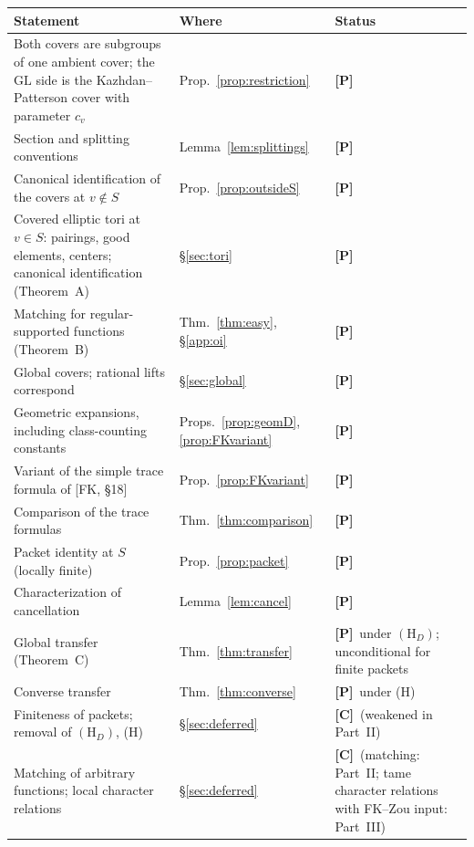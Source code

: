 \documentclass[12pt]{article}
\newcommand{\GL}{\mathrm{GL}}
\newcommand{\Pv}{\textbf{[P]}}
\newcommand{\Cv}{\textbf{[C]}}
\theoremstyle{plain}
\theoremstyle{definition}
\begin{document}
\begin{center}
\begin{tabular}{>{\raggedright\arraybackslash}p{}>{\raggedright\arraybackslash}p{}>{\raggedright\arraybackslash}p{}}
\toprule
Statement & Where & Status\\
\midrule
Both covers are subgroups of one ambient cover; the $\GL$ side is the Kazhdan--Patterson cover with parameter $c_v$ & Prop.~\ref{prop:restriction} & \Pv\\
Section and splitting conventions & Lemma~\ref{lem:splittings} & \Pv\\
Canonical identification of the covers at $v\notin S$ & Prop.~\ref{prop:outsideS} & \Pv\\
Covered elliptic tori at $v\in S$: pairings, good elements, centers; canonical identification (Theorem~A) & \S\ref{sec:tori} & \Pv\\
Matching for regular-supported functions (Theorem~B) & Thm.~\ref{thm:easy}, \S\ref{app:oi} & \Pv\\
Global covers; rational lifts correspond & \S\ref{sec:global} & \Pv\\
Geometric expansions, including class-counting constants & Props.~\ref{prop:geomD}, \ref{prop:FKvariant} & \Pv\\
Variant of the simple trace formula of [FK, \S18] & Prop.~\ref{prop:FKvariant} & \Pv\\
Comparison of the trace formulas & Thm.~\ref{thm:comparison} & \Pv\\
Packet identity at $S$ (locally finite) & Prop.~\ref{prop:packet} & \Pv\\
Characterization of cancellation & Lemma~\ref{lem:cancel} & \Pv\\
Global transfer (Theorem~C) & Thm.~\ref{thm:transfer} & \Pv\ under $(\mathrm H_D)$; unconditional for finite packets\\
Converse transfer & Thm.~\ref{thm:converse} & \Pv\ under (H)\\
Finiteness of packets; removal of $(\mathrm H_D)$, (H) & \S\ref{sec:deferred} & \Cv\ (weakened in Part~II)\\
Matching of arbitrary functions; local character relations & \S\ref{sec:deferred} & \Cv\ (matching: Part~II; tame character relations with FK--Zou input: Part~III)\\
\bottomrule
\end{tabular}
\end{center}
\end{document}
